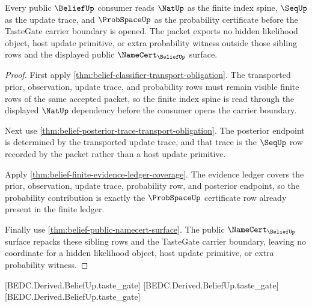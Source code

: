 \begin{theorem}
\label{thm:belief-sibling-dependency-lattice}
Every public $\BeliefUp$ consumer reads $\NatUp$ as the finite index spine, $\SeqUp$ as the update trace, and $\ProbSpaceUp$ as the probability certificate before the TasteGate carrier boundary is opened. The packet exports no hidden likelihood object, host update primitive, or extra probability witness outside those sibling rows and the displayed public $\NameCert_{\BeliefUp}$ surface.
\end{theorem}
\begin{proof}
First apply \autoref{thm:belief-classifier-transport-obligation}. The transported prior, observation, update trace, and probability rows must remain visible finite rows of the same accepted packet, so the finite index spine is read through the displayed $\NatUp$ dependency before the consumer opens the carrier boundary.

Next use \autoref{thm:belief-posterior-trace-transport-obligation}. The posterior endpoint is determined by the transported update trace, and that trace is the $\SeqUp$ row recorded by the packet rather than a host update primitive.

Apply \autoref{thm:belief-finite-evidence-ledger-coverage}. The evidence ledger covers the prior, observation, update trace, probability row, and posterior endpoint, so the probability contribution is exactly the $\ProbSpaceUp$ certificate row already present in the finite ledger.

Finally use \autoref{thm:belief-public-namecert-surface}. The public $\NameCert_{\BeliefUp}$ surface repacks these sibling rows and the TasteGate carrier boundary, leaving no coordinate for a hidden likelihood object, host update primitive, or extra probability witness.
\end{proof}

[BEDC.Derived.BeliefUp.taste\_gate]
[BEDC.Derived.BeliefUp.taste\_gate]
[BEDC.Derived.BeliefUp.taste\_gate]

